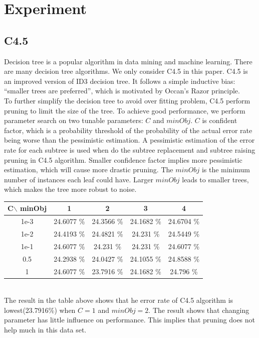 \documentclass[a4paper,11pt]{article}
\begin{document}
\section{Experiment}
\subsection{C4.5}
Decision tree is a popular algorithm in data mining and machine learning. There are many decision tree algorithms. We only consider C4.5 in this paper. C4.5 is an improved version of ID3 decision tree. It follows a simple inductive bias: ``smaller trees are preferred'', which is motivated by Occan's Razor principle.\\
To further simplify the decision tree to avoid over fitting problem, C4.5 perform pruning to limit the size of the tree. To achieve good performance, we perform parameter search on two tunable parameters: $C$ and $minObj$. $C$ is confident factor, which is a probability threshold of the probability of the actual error rate being worse than the pessimistic estimation\cite{morgan.kaufmann}. A pessimistic estimation of the error rate for each subtree is used when do the subtree replacement and subtree raising pruning in C4.5 algorithm. Smaller confidence factor implies more pessimistic estimation, which will cause more drastic pruning. The $minObj$ is the minimum number of instances each leaf could have. Larger $minObj$ leads to smaller trees, which makes the tree more robust to noise.
\vspace{0.5cm}\\
\begin{tabular}{c|c c c c}
C$\backslash$ minObj	&1		&2		&3		&4\\
\hline \hline
1e-3 	&24.6077 \%	&24.3566 \%	&24.1682 \%	 &24.6704 \%\\
1e-2	&24.4193 \%	 &24.4821 \%	&24.231  \%	 &24.5449 \%\\
1e-1	&24.6077 \%	&24.231  \%	&24.231  \%	 &24.6077 \%\\
0.5 &24.2938 \%     &24.0427 \% &24.1055 \%  &24.8588 \%\\
1	&24.6077 \%	    &23.7916 \%	&24.1682 \%	 &24.796  \%\\
\end{tabular}
\vspace{0.5cm}\\
The result in the table above shows that he error rate of C4.5 algorithm is lowest(23.7916\%) when $C=1$ and $minObj=2$. The result shows that changing parameter has little influence on performance. This implies that pruning does not help much in this data set.\\
\end{document}
